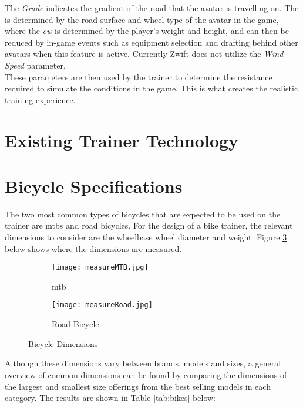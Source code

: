 The \textit{Grade} indicates the gradient of the road that the avatar is travelling on. The  is determined by the road surface and wheel type of the avatar in the game, where the \textit{\ac{cw}} is determined by the player's weight and height, and can then be reduced by in-game events such as equipment selection and drafting behind other avatars when this feature is active. Currently Zwift does not utilize the \textit{Wind Speed} parameter.\\
These parameters are then used by the trainer to determine the resistance required to simulate the conditions in the game. This is what creates the realistic training experience.

\newpage

\section{Existing Trainer Technology}
\label{sec:train}

\newpage

\section{Bicycle Specifications}
The two most common types of bicycles that are expected to be used on the trainer are \acp{mtb} and road bicycles. For the design of a bike trainer, the relevant dimensions to consider are the wheelbase wheel diameter and weight. Figure \ref{fig:bikeDim} below shows where the dimensions are measured.

\begin{figure}[ht]
	\centering
	\begin{subfigure}{.5\textwidth}
		\centering
		\texttt{[image: measureMTB.jpg]}
		\caption{\ac{mtb} \citep[model by:][]{Pratama:2021}}
		\label{fig:sub1}
	\end{subfigure}%
	\begin{subfigure}{.5\textwidth}
		\centering
		\texttt{[image: measureRoad.jpg]}
		\caption{Road Bicycle \citep[model by:][]{Morozev:2017}}
		\label{fig:sub2}
	\end{subfigure}
	\caption{Bicycle Dimensions}
	\label{fig:bikeDim}
\end{figure}
Although these dimensions vary between brands, models and sizes, a general overview of common dimensions can be found by comparing the dimensions of the largest and smallest size offerings from the best selling models in each category. \citep{Lin:2021}The results are shown in Table \ref{tab:bikes} below: \citep{Geometry:2022}

